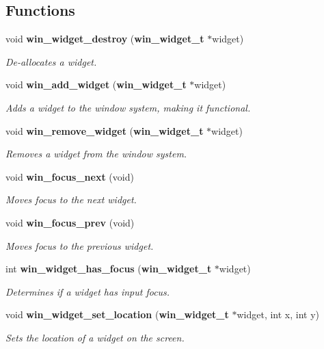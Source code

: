 \subsection*{Functions}
\begin{CompactItemize}
\item 
void {\bf win\_\-widget\_\-destroy} ({\bf win\_\-widget\_\-t} $\ast$widget)
\begin{CompactList}\small\item\em De-allocates a widget. \item\end{CompactList}\item 
void {\bf win\_\-add\_\-widget} ({\bf win\_\-widget\_\-t} $\ast$widget)
\begin{CompactList}\small\item\em Adds a widget to the window system, making it functional. \item\end{CompactList}\item 
void {\bf win\_\-remove\_\-widget} ({\bf win\_\-widget\_\-t} $\ast$widget)
\begin{CompactList}\small\item\em Removes a widget from the window system. \item\end{CompactList}\item 
void {\bf win\_\-focus\_\-next} (void)
\begin{CompactList}\small\item\em Moves focus to the next widget. \item\end{CompactList}\item 
void {\bf win\_\-focus\_\-prev} (void)
\begin{CompactList}\small\item\em Moves focus to the previous widget. \item\end{CompactList}\item 
int {\bf win\_\-widget\_\-has\_\-focus} ({\bf win\_\-widget\_\-t} $\ast$widget)
\begin{CompactList}\small\item\em Determines if a widget has input focus. \item\end{CompactList}\item 
void {\bf win\_\-widget\_\-set\_\-location} ({\bf win\_\-widget\_\-t} $\ast$widget, int x, int y)
\begin{CompactList}\small\item\em Sets the location of a widget on the screen. \item\end{CompactList}\item 

\end{CompactItemize}
